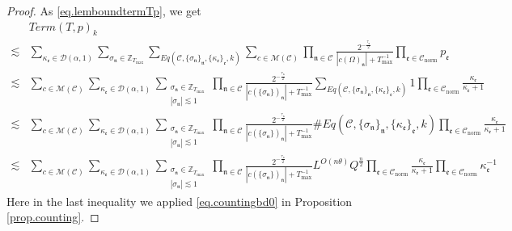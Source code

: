 \begin{proof}
As \eqref{eq.lemboundtermTp}, we get
\begin{equation}\label{eq.lemboundtermTpop}
\begin{split}
    &Term(T, p)_k
    \\
    \lesssim& \sum_{\kappa_{\mathfrak{e}}\in \mathcal{D}(\alpha,1)}\sum_{\sigma_{\mathfrak{n}}\in \mathbb{Z}_{T_{\text{max}}}}\sum_{Eq(\mathcal{C}, \{\sigma_{\mathfrak{n}}\}_{\mathfrak{n}}, \{\kappa_{\mathfrak{e}}\}_{\mathfrak{e}},k)} \sum_{c\in \mathscr{M}(\mathcal{C}) }\prod_{\mathfrak{n}\in \mathcal{C}}\frac{2^{-\frac{\tau_{\mathfrak{n}}}{2}}}{|c(\Omega)_{\mathfrak{n}}|+T^{-1}_{\text{max}}} \prod_{\mathfrak{e}\in \mathcal{C}_{\text{norm}}} p_{\mathfrak{e}}
    \\
    \lesssim &\sum_{c\in \mathscr{M}(\mathcal{C}) }\sum_{\kappa_{\mathfrak{e}}\in \mathcal{D}(\alpha,1)}\sum_{\substack{\sigma_{\mathfrak{n}}\in \mathbb{Z}_{T_{\text{max}}}\\ |\sigma_{\mathfrak{n}}|\lesssim 1}}\prod_{\mathfrak{n}\in \mathcal{C}}\frac{2^{-\frac{\tau_{\mathfrak{n}}}{2}}}{|c(\{\sigma_{\mathfrak{n}}\})_{\mathfrak{n}}|+T^{-1}_{\text{max}}} \sum_{Eq(\mathcal{C}, \{\sigma_{\mathfrak{n}}\}_{\mathfrak{n}}, \{\kappa_{\mathfrak{e}}\}_{\mathfrak{e}},k)} 1 \prod_{\mathfrak{e}\in \mathcal{C}_{\text{norm}}} \frac{\kappa_{\mathfrak{e}}}{\kappa_{\mathfrak{e}}+1}
    \\
    \lesssim &\sum_{c\in \mathscr{M}(\mathcal{C}) }\sum_{\kappa_{\mathfrak{e}}\in \mathcal{D}(\alpha,1)}\sum_{\substack{\sigma_{\mathfrak{n}}\in \mathbb{Z}_{T_{\text{max}}}\\ |\sigma_{\mathfrak{n}}|\lesssim 1}}\prod_{\mathfrak{n}\in \mathcal{C}}\frac{2^{-\frac{\tau_{\mathfrak{n}}}{2}}}{|c(\{\sigma_{\mathfrak{n}}\})_{\mathfrak{n}}|+T^{-1}_{\text{max}}} \#Eq(\mathcal{C}, \{\sigma_{\mathfrak{n}}\}_{\mathfrak{n}}, \{\kappa_{\mathfrak{e}}\}_{\mathfrak{e}},k) \prod_{\mathfrak{e}\in \mathcal{C}_{\text{norm}}} \frac{\kappa_{\mathfrak{e}}}{\kappa_{\mathfrak{e}}+1}
    \\
    \lesssim &\sum_{c\in \mathscr{M}(\mathcal{C}) }\sum_{\kappa_{\mathfrak{e}}\in \mathcal{D}(\alpha,1)}\sum_{\substack{\sigma_{\mathfrak{n}}\in \mathbb{Z}_{T_{\text{max}}}\\ |\sigma_{\mathfrak{n}}|\lesssim 1}}\prod_{\mathfrak{n}\in \mathcal{C}}\frac{2^{-\frac{\tau_{\mathfrak{n}}}{2}}}{|c(\{\sigma_{\mathfrak{n}}\})_{\mathfrak{n}}|+T^{-1}_{\text{max}}} L^{O(n\theta)} Q^{\frac{n}{2}} \prod_{\mathfrak{e}\in \mathcal{C}_{\text{norm}}} \frac{\kappa_{\mathfrak{e}}}{\kappa_{\mathfrak{e}}+1} \prod_{\mathfrak{e}\in \mathcal{C}_{\text{norm}}} \kappa_{\mathfrak{e}}^{-1}
\end{split}
\end{equation}
Here in the last inequality we applied \eqref{eq.countingbd0} in Proposition \ref{prop.counting}.


\end{proof}
